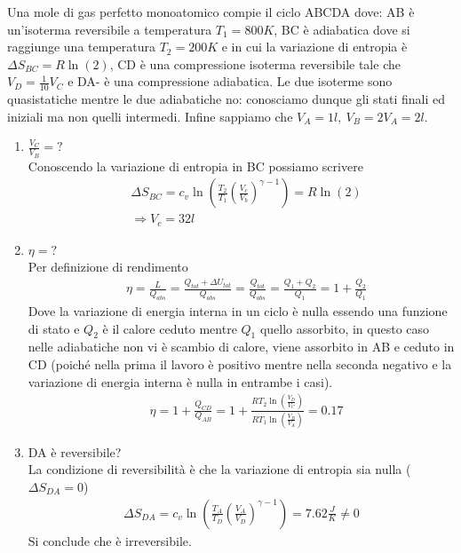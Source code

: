 \documentclass[
10pt, %
a4paper, %
oneside, %
headinclude,footinclude, %
BCOR5mm, %
]{scrartcl}
\begin{document}
\begin{exercise}
	Una mole di gas perfetto monoatomico compie il ciclo ABCDA dove: AB è un'isoterma reversibile a temperatura \(T_1 = 800 K\), BC è adiabatica dove si raggiunge una temperatura \(T_2 = 200 K\) e in cui la variazione di entropia è \(\Delta S_{BC}=R\ln(2)\), CD è una compressione isoterma reversibile tale che \(V_D = \frac{1}{10}V_C\) e DA- è una compressione adiabatica. Le due isoterme sono quasistatiche mentre le due adiabatiche no: conosciamo dunque gli stati finali ed iniziali ma non quelli intermedi. Infine sappiamo che \(V_A = 1l,\ V_B =2V_A=2l\).
	\begin{enumerate}
		\item \(\frac{V_C}{V_B} = ?\)\\
		Conoscendo la variazione di entropia in BC possiamo scrivere
		\begin{align*}
			&\Delta S_{BC} = c_v \ln\left(\frac{T_2}{T_1}\left(\frac{V_c}{V_b}\right)^{\gamma - 1}\right) = R\ln(2)\\
			&\Rightarrow V_c = 32l
		\end{align*}
		\item \(\eta = ?\)\\
		Per definizione di rendimento
		\begin{align*}
			&\eta = \frac{L}{Q_{abs}} = \frac{Q_{tot}+\Delta U_{tot}}{Q_{abs}}=\frac{Q_{tot}}{Q_{abs}}=\frac{Q_1 + Q_2}{Q_1} = 1+\frac{Q_2}{Q_1}
		\end{align*}
		Dove la variazione di energia interna in un ciclo è nulla essendo una funzione di stato e \(Q_2\) è il calore ceduto mentre \(Q_1\) quello assorbito, in questo caso nelle adiabatiche non vi è scambio di calore, viene assorbito in AB e ceduto in CD (poiché nella prima il lavoro è positivo mentre nella seconda negativo e la variazione di energia interna è nulla in entrambe i casi).
		\begin{align*}
			&\eta = 1+\frac{Q_{CD}}{Q_{AB}} = 1+\frac{R T_2\ln(\frac{V_D}{V_C})}{R T_1\ln(\frac{V_B}{V_A})}=0.17
		\end{align*}
		\item DA è reversibile?\\
		La condizione di reversibilità è che la variazione di entropia sia nulla (\(\Delta S_{DA} = 0\))
		\begin{align*}
			\Delta S_{DA} = c_v \ln\left(\frac{T_A}{T_D}\left(\frac{V_A}{V_D}\right)^{\gamma - 1}\right) = 7.62 \frac{J}{K}\neq 0
		\end{align*}
		Si conclude che è irreversibile. 

\end{enumerate}
\end{exercise}
\end{document}
